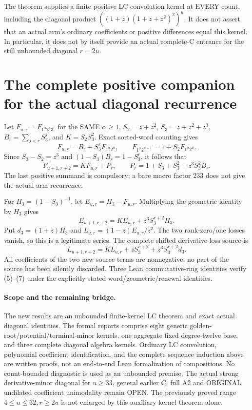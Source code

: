 The theorem supplies a finite positive LC convolution kernel at
EVERY count, including the diagonal product
$((1+z)(1+z+z^2)^2)^u$. It does not assert that an actual arm's
ordinary coefficients or positive differences equal this kernel.
In particular, it does not by itself provide an actual complete-C
entrance for the still unbounded diagonal $r=2u$.

\section{The complete positive companion for the actual diagonal recurrence}
Let $F_{u,r}=F_{1^\alpha2^u3^r}$ for the SAME $\alpha\ge1$,
$S_2=z+z^2$, $S_3=z+z^2+z^3$, $B_r=\sum_{j<r}S_3^j$,
and $K=S_2S_3^2$. Exact sorted-word counting gives
\[
 F_{u,r}=B_r+S_3^rF_{1^\alpha2^u},\qquad
 F_{1^\alpha2^{u+1}}=1+S_2F_{1^\alpha2^u}.
\]
Since $S_3-S_2=z^3$ and $(1-S_3)B_r=1-S_3^r$, it follows that
\[
 F_{u+1,r+2}=K F_{u,r}+P_r,\qquad
 P_r=1+S_3+S_3^2+z^3S_3^2B_r.                   \tag{5}
\]
The last positive summand is compulsory; a bare macro factor 233
does not give the actual arm recurrence.

For $H_3=(1-S_3)^{-1}$, let $E_{u,r}=H_3-F_{u,r}$.
Multiplying the geometric identity by $H_3$ gives
\[
 E_{u+1,r+2}=K E_{u,r}+z^3S_3^{r+2}H_3.          \tag{6}
\]
Put $d_3=(1+z)H_3$ and $L_{u,r}=(1-z)E_{u,r}/z^2$.
The two rank-zero/one losses vanish, so this is a legitimate series.
The complete shifted derivative-loss source is
\[
 L_{u+1,r+2}=K L_{u,r}+zS_3^{r+2}
                              +z^3S_3^{r+2}d_3. \tag{7}
\]
All coefficients of the two new source terms are nonnegative;
no part of the source has been silently discarded.
Three Lean commutative-ring identities verify (5)--(7) under
the explicitly stated word/geometric/renewal identities.

\paragraph{Scope and the remaining bridge.}
The new results are an unbounded finite-kernel LC theorem and exact
actual diagonal identities. The formal reports comprise eight
generic golden-root/potential/terminal-minor kernels, one aggregate
fixed degree-twelve base, and three complete diagonal algebra
kernels. Ordinary LC convolution, polynomial coefficient
identification, and the complete sequence induction above are
written proofs, not an end-to-end Lean formalization of compositions.
No count-bounded diagnostic is used as an unbounded premise.
The actual strong derivative-minor diagonal for $u\ge33$, general
earlier C, full A2 and ORIGINAL undilated coefficient unimodality
remain OPEN. The previously proved range $4\le u\le32,r\ge2u$
is not enlarged by this auxiliary kernel theorem alone.
